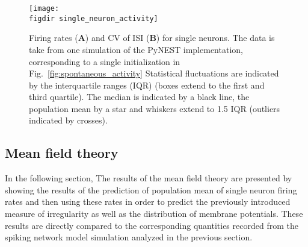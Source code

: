 \begin{figure}[tb]
    \centering
    \texttt{[image: \\figdir single\_neuron\_activity]}
    \caption{
        Firing rates (\textbf{A}) and CV of ISI (\textbf{B}) for single neurons. 
        The data is take from one simulation of the PyNEST implementation, 
        corresponding to a single initialization in Fig.~\ref{fig:spontaneous_activity}
        Statistical fluctuations 
        are indicated by the interquartile ranges (IQR) (boxes extend to 
        the first and third quartile). 
        The median is indicated by a black line, the population mean by a star and 
        whiskers extend to 1.5 IQR (outliers indicated by crosses). 
    }
    \label{fig:single_neuron_activity}
\end{figure}

\subsection{Mean field theory}
In the following section, The results of the mean field theory are presented 
by showing the results of the prediction of 
population mean of single neuron firing rates and then using these rates 
in order to predict the previously introduced measure of irregularity
as well as the distribution of membrane potentials. 
These results are directly compared to 
the corresponding quantities recorded from the spiking network 
model simulation analyzed in the previous section. 

